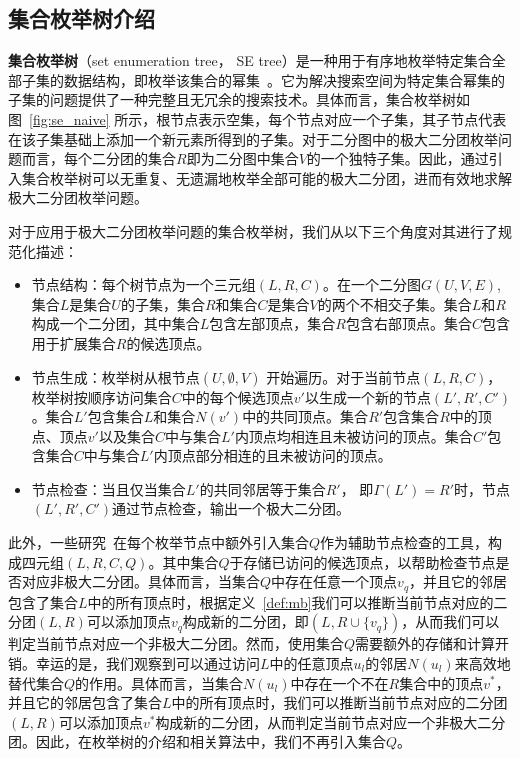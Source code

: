 \subsection{集合枚举树介绍}
\label{subsec:se}


\textbf{集合枚举树}（set enumeration tree， SE tree）是一种用于有序地枚举特定集合全部子集的数据结构，即枚举该集合的幂集~\cite{SEtree92}。它为解决搜索空间为特定集合幂集的子集的问题提供了一种完整且无冗余的搜索技术。具体而言，集合枚举树如图~\ref{fig:se_naive} 所示，根节点表示空集，每个节点对应一个子集，其子节点代表在该子集基础上添加一个新元素所得到的子集。对于二分图中的极大二分团枚举问题而言，每个二分团的集合$R$即为二分图中集合$V$的一个独特子集。因此，通过引入集合枚举树可以无重复、无遗漏地枚举全部可能的极大二分团，进而有效地求解极大二分团枚举问题。

对于应用于极大二分团枚举问题的集合枚举树，我们从以下三个角度对其进行了规范化描述：

\begin{itemize}
  \item 节点结构：每个树节点为一个三元组$(L,R,C)$。在一个二分图$G(U,V,E)$,集合$L$是集合$U$的子集，集合$R$和集合$C$是集合$V$的两个不相交子集。集合$L$和$R$构成一个二分团，其中集合$L$包含左部顶点，集合$R$包含右部顶点。集合$C$包含用于扩展集合$R$的候选顶点。
  \item 节点生成：枚举树从根节点$(U,\emptyset,V)$ 开始遍历。对于当前节点$(L,R,C)$，枚举树按顺序访问集合$C$中的每个候选顶点$v'$以生成一个新的节点$(L',R',C')$。集合$L'$包含集合$L$和集合$N(v')$中的共同顶点。集合$R'$包含集合$R$中的顶点、顶点$v'$以及集合$C$中与集合$L'$内顶点均相连且未被访问的顶点。集合$C'$包含集合$C$中与集合$L'$内顶点部分相连的且未被访问的顶点。
  \item 节点检查：当且仅当集合$L'$的共同邻居等于集合$R'$， 即$\Gamma(L')=R'$时，节点$(L',R',C')$通过节点检查，输出一个极大二分团。
\end{itemize}

此外，一些研究~\cite{iMBEA14,ooMBE22}在每个枚举节点中额外引入集合$Q$作为辅助节点检查的工具，构成四元组$(L,R,C,Q)$。其中集合$Q$于存储已访问的候选顶点，以帮助检查节点是否对应非极大二分团。具体而言，当集合$Q$中存在任意一个顶点$v_q$，并且它的邻居包含了集合$L$中的所有顶点时，根据定义~\ref{def:mb}我们可以推断当前节点对应的二分团$(L,R)$可以添加顶点$v_q$构成新的二分团，即$(L, R\cup\{v_q\})$，从而我们可以判定当前节点对应一个非极大二分团。然而，使用集合$Q$需要额外的存储和计算开销。幸运的是，我们观察到可以通过访问$L$中的任意顶点$u_l$的邻居$N(u_l)$来高效地替代集合$Q$的作用。具体而言，当集合$N(u_l)$中存在一个不在$R$集合中的顶点$v^*$，并且它的邻居包含了集合$L$中的所有顶点时，我们可以推断当前节点对应的二分团$(L,R)$可以添加顶点$v^*$构成新的二分团，从而判定当前节点对应一个非极大二分团。因此，在枚举树的介绍和相关算法中，我们不再引入集合$Q$。

